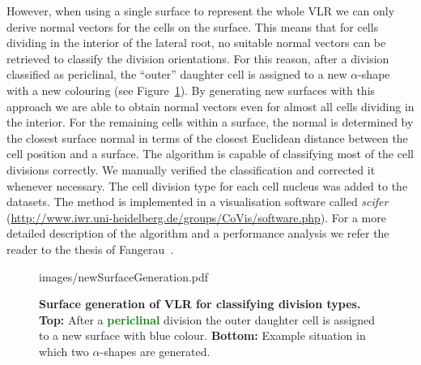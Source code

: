 \documentclass[11pt,a4paper, final]{article}
\begin{document}
%
However, when using a single surface to represent the whole VLR we can only derive normal vectors for the cells on the surface. This means that for cells dividing in the interior of the lateral root, no suitable normal vectors can be retrieved to classify the division orientations. For this reason, after a division classified as periclinal, the ``outer'' daughter cell is assigned to a new $\alpha$-shape with a new colouring (see Figure~\ref{fig:newSurfaceGeneration}). By generating new surfaces with this approach we are able to obtain normal vectors even for almost all cells dividing in the interior. For the remaining cells within a surface, the normal is determined by the closest surface normal in terms of the closest Euclidean distance between the cell position and a surface. The algorithm is capable of classifying most of the cell divisions correctly. We manually verified the classification and corrected it whenever necessary. The cell division type for each cell nucleus was added to the datasets. The method is implemented in a visualisation software called \textit{scifer}~\cite{leitte_et_al_2012} (\href{http://www.iwr.uni-heidelberg.de/groups/CoVis/software.php}{http://www.iwr.uni-heidelberg.de/groups/CoVis/software.php}). For a more detailed description of the algorithm and a performance analysis we refer the reader to the thesis of Fangerau~\cite[chapter 4]{FangerauDiss_2015}.
%
\begin{figure}[htbp]
	\begin{center}
		\begin{overpic}[width=0.9\linewidth]{images/newSurfaceGeneration.pdf}
		\end{overpic}
\caption[]
{
{\bf Surface generation of VLR for classifying division types. Top:} After a \textcolor{green}{\textbf{periclinal}} division the outer daughter cell is assigned to a new surface with blue colour. {\bf Bottom:} Example situation in which two $\alpha$-shapes are generated.
}
	\label{fig:newSurfaceGeneration}
	\end{center}
\end{figure}
%
\end{document}
